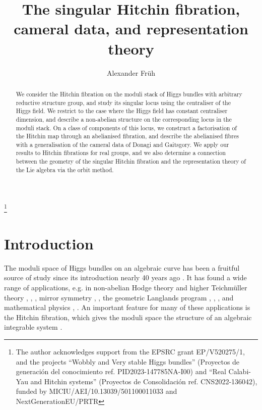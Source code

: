 \documentclass{amsart}
\theoremstyle{remark}
\numberwithin{theorem}{section}
\numberwithin{equation}{section}
\begin{document}
\setcounter{page}{1}

\centerline{}

\centerline{}

\title[The singular Hitchin fibration]{The singular Hitchin fibration, cameral data, and representation theory}

\author[A. Fr\"{u}h]{Alexander Fr\"{u}h}
\address{School of Mathematics, University of Birmingham, Birmingham, UK.}



\thanks{The author acknowledges support from the EPSRC grant EP/V520275/1, and the projects ``Wobbly and Very stable Higgs bundles'' (Proyectos de generación del conocimiento ref. PID2023-147785NA-I00) and ``Real Calabi-Yau and Hitchin systems'' (Proyectos de Consolidación ref. CNS2022-136042), funded by MICIU/AEI/10.13039/501100011033 and NextGenerationEU/PRTR}

\begin{abstract}
    We consider the Hitchin fibration on the moduli stack of Higgs bundles with arbitrary reductive structure group, and study its singular locus using the centraliser of the Higgs field. We restrict to the case where the Higgs field has constant centraliser dimension, and describe a non-abelian structure on the corresponding locus in the moduli stack. On a class of components of this locus, we construct a factorisation of the Hitchin map through an abelianised fibration, and describe the abelianised fibres with a generalisation of the cameral data of Donagi and Gaitsgory. We apply our results to Hitchin fibrations for real groups, and we also determine a connection between the geometry of the singular Hitchin fibration and the representation theory of the Lie algebra via the orbit method.
\end{abstract}
\maketitle

\tableofcontents

\section{Introduction}

The moduli space of Higgs bundles on an algebraic curve has been a fruitful source of study since its introduction nearly 40 years ago \cite{Hitchin1}. It has found a wide range of applications, e.g. in non-abelian Hodge theory and higher Teichmüller theory \cite{Simpson1}, \cite{Hitchin3}, \cite{BIW}, mirror symmetry \cite{HT}, \cite{GWZ}, the geometric Langlands program \cite{BD}, \cite{KW}, \cite{DP}, and mathematical physics \cite{KW}, \cite{GMN}. An important feature for many of these applications is the Hitchin fibration, which gives the moduli space the structure of an algebraic integrable system \cite{Hitchin2}.
\end{document}
